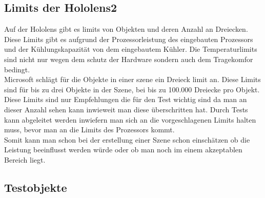 
\subsection{Limits der Hololens2}\label{subsec:Limits der Hololens2}

Auf der Hololens gibt es limits von Objekten und deren Anzahl an Dreiecken.
Diese Limits gibt es aufgrund der Prozessorleistung des eingebauten Prozessors und der Kühlungskapazität von dem eingebautem Kühler.
Die Temperaturlimits sind nicht nur wegen dem schutz der Hardware sondern auch dem Tragekomfor bedingt.\\
Microsoft schlägt für die Objekte in einer szene ein Dreieck limit an. Diese Limits sind für bis zu drei Objekte in der Szene, bei bis zu 100.000\autocite{optimize_3d} Dreiecke pro Objekt.\\ 
Diese Limits sind nur Empfehlungen die für den Test wichtig sind da man an dieser Anzahl sehen kann inwieweit man diese überschritten hat.
Durch Tests kann abgeleitet werden inwiefern man sich an die vorgeschlagenen Limits halten muss, bevor man an die Limits des Prozessors kommt.\\
Somit kann man schon bei der erstellung einer Szene schon einschätzen ob die Leistung beeinflusst werden würde oder ob man noch im einem akzeptablen Bereich liegt.



\newpage
\subsection{Testobjekte}\label{subsec:Testobjekte}


